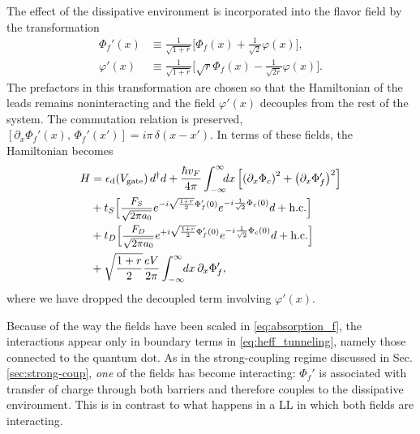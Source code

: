 \documentclass[aps,prb,reprint,floatfix,superscriptaddress,amssymb,amsmath]{revtex4-2}
\newcommand{\Vg}{V_\text{gate}}
\newcommand{\sdfrac}[2]{\mbox{\small$\displaystyle\frac{#1}{#2}$}}
\begin{document}
The effect of the dissipative environment is incorporated into the flavor field by the transformation
\begin{align}
\Phi_{f}'(x) & \equiv \frac{1}{\sqrt{1+r}}\Big[\Phi_{f}(x)+\frac{1}{\sqrt{2}}\varphi(x) \Big],\nonumber \\
\varphi'(x) & \equiv \frac{1}{\sqrt{1+r}}\Big[\sqrt{r}\Phi_{f}(x) -\frac{1}{\sqrt{2r}}\varphi(x) \Big] .
\label{eq:absorption_f}
\end{align}
The prefactors in this transformation are chosen so that the Hamiltonian of the leads remains noninteracting and the field $\varphi'(x)$ decouples from the rest of the system. The commutation relation is preserved, 
 $[\partial_x \Phi_f'(x),\,\Phi_f'(x')] \!=\! i\pi\, \delta (x-x')$.  
 In terms of these fields, the Hamiltonian becomes
\begin{equation}
\begin{aligned}
 H &= \epsilon_\text{d}(\Vg) \,d^\dagger d 
 + \frac{\hbar v_{F}}{4\pi}\int_{-\infty}^{\infty} \!\!\!dx
 \left[\left(\partial_{x}\Phi_{c}\right)^{2}+\left(\partial_{x}\Phi_{f}'\right)^{2}\right] 
 \\
  &  +  t_S \Big[\sdfrac{F_{S}}{\sqrt{2\pi a_0}} 
 e^{-i\sqrt{\frac{1+r}{2}}\Phi_f'(0)}  e^{-i\frac{1}{\sqrt{2}}\Phi_{c}(0)} d %
 + \text{h.c.}\Big] 
\\
 &  +  t_D \Big[\sdfrac{F_{D}}{\sqrt{2\pi a_0}}  
 e^{+i\sqrt{\frac{1+r}{2}}\Phi_f'(0)}  e^{-i\frac{1}{\sqrt{2}}\Phi_{c}(0)}   d %
 + \text{h.c.}\Big] \\
 & +\sqrt{\frac{1+r}{2}} \frac{eV}{2\pi} \int_{-\infty}^{\infty} \!\!dx\, \partial_x \Phi_f', 
\end{aligned}
\label{eq:heff_tunneling}
\end{equation}
where we have dropped the decoupled term involving $\varphi'(x)$. 

Because of the way the fields have been scaled in \eqref{eq:absorption_f}, the interactions appear only in boundary terms in \eqref{eq:heff_tunneling}, namely those connected to the quantum dot. As in the strong-coupling regime discussed in Sec.\,\ref{sec:strong-coup}, \emph{one} of the fields has become interacting: $\Phi_f'$ is associated with transfer of charge through both barriers and therefore couples to the dissipative environment. This is in contrast to what happens in a LL in which both fields are interacting. 
\end{document}
